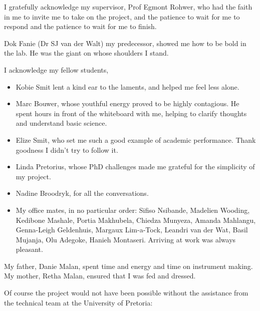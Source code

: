 \documentclass[
11pt, %
english, %
singlespacing, %
liststotoc, %
toctotoc, %
headsepline, %
]{MastersDoctoralThesis} %
\begin{document}

\begin{acknowledgements}
\addchaptertocentry{\acknowledgementname} %

I gratefully acknowledge my supervisor, Prof Egmont Rohwer, who had the faith in
me to invite me to take on the project, and the patience to wait for me to
respond and the patience to wait for me to finish. 

Dok Fanie (Dr SJ van der Walt) my predecessor, showed me how to be bold in the
lab. He was the giant on whose shoulders I stand.

I acknowledge my fellow students,
\begin{itemize} 
  
\item Kobie Smit lent a kind ear to the laments, and helped me feel less alone.

\item Marc Bouwer, whose youthful energy proved to be highly contagious. He
spent hours in front of the whiteboard with me, helping to clarify thoughts and
understand basic science.

\item Elize Smit, who set me such a good example of academic performance. Thank
goodness I didn't try to follow it.
 
\item Linda Pretorius, whose PhD challenges made me grateful for the simplicity
of my project.

\item Nadine Broodryk, for all the conversations.

\item My office mates, in no particular order: Sifiso Nsibande, Madelien
Wooding, Kedibone Mashale, Portia Makhubela, Chiedza Munyeza, Amanda Mahlangu,
Genna-Leigh Geldenhuis, Margaux Lim-a-Tock, Leandri van der Wat, Basil Mujanja,
Olu Adegoke, Hanieh Montaseri. Arriving at work was always pleasant.

\end{itemize}

My father, Danie Malan, spent time and energy and time on instrument making. My
mother, Retha Malan, ensured that I was fed and dressed. 

Of course the project would not have been possible without the assistance from
the technical team at the University of Pretoria:


\end{acknowledgements}
\end{document}

